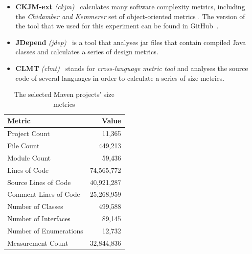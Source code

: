 \documentclass{sig-alternate}
\begin{document}
\begin{itemize}
  \item \textbf{CKJM-ext} \textit{(ckjm)}~\cite{Spi05g}
calculates many software complexity metrics, including the \textit{Chidamber and Kemmerer} set of object-oriented metrics \cite{CHKE94}. The version of the tool that we used for this experiment can be found in GitHub~\cite{CKJM}.

  \item \textbf{JDepend} \textit{(jdep)}~\cite{JDEPEND} is a tool that analyses {\sc jar} files that contain compiled Java classes and calculates a series of design metrics.

  \item \textbf{CLMT} \textit{(clmt)}~\cite{SGKL09} stands for \textit{cross-language metric tool} and analyses the source code of several languages in order to calculate a series of size metrics.
\end{itemize}


\begin{table}
\centering
\caption{The selected Maven projects' size metrics}
\label{tbl:oss-size-metrics}
\begin{tabular}{l r}
 \hline
\textbf{Metric} & \textbf{Value}\\
\hline
Project Count & 11,365\\
File Count & 449,213\\
Module Count & 59,436\\
Lines of Code & 74,565,772\\
Source Lines of Code & 40,921,287\\
Comment Lines of Code & 25,268,959\\
Number of Classes & 499,588\\
Number of Interfaces & 89,145\\
Number of Enumerations & 12,732\\
Measurement Count & 32,844,836\\
\hline
\end{tabular}
\end{table}
\end{document}
